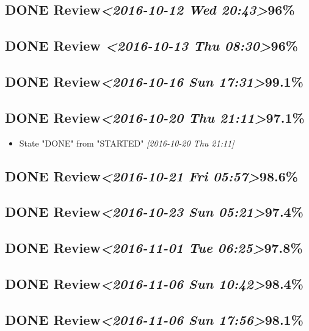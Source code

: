 \documentclass[11pt]{ctexart}
\begin{document}
\subsection{{\bfseries\sffamily DONE} Review\textit{<2016-10-12 Wed 20:43>}96\%}
\label{sec:org111e863}
\subsection{{\bfseries\sffamily DONE} Review \textit{<2016-10-13 Thu 08:30>}96\%}
\label{sec:orgfcc7a84}
\subsection{{\bfseries\sffamily DONE} Review\textit{<2016-10-16 Sun 17:31>}99.1\%}
\label{sec:orgd704733}
\subsection{{\bfseries\sffamily DONE} Review\textit{<2016-10-20 Thu 21:11>}97.1\%}
\label{sec:org7a4d4cb}
\begin{itemize}
\item State "DONE"       from "STARTED"    \textit{[2016-10-20 Thu 21:11]}
\end{itemize}
\subsection{{\bfseries\sffamily DONE} Review\textit{<2016-10-21 Fri 05:57>}98.6\%}
\label{sec:org9d9b5dd}
\subsection{{\bfseries\sffamily DONE} Review\textit{<2016-10-23 Sun 05:21>}97.4\%}
\label{sec:org7d10b63}
\subsection{{\bfseries\sffamily DONE} Review\textit{<2016-11-01 Tue 06:25>}97.8\%}
\label{sec:org425151e}
\subsection{{\bfseries\sffamily DONE} Review\textit{<2016-11-06 Sun 10:42>}98.4\%}
\label{sec:orgca8a962}
\subsection{{\bfseries\sffamily DONE} Review\textit{<2016-11-06 Sun 17:56>}98.1\%}
\label{sec:org4e7504d}
\end{document}

